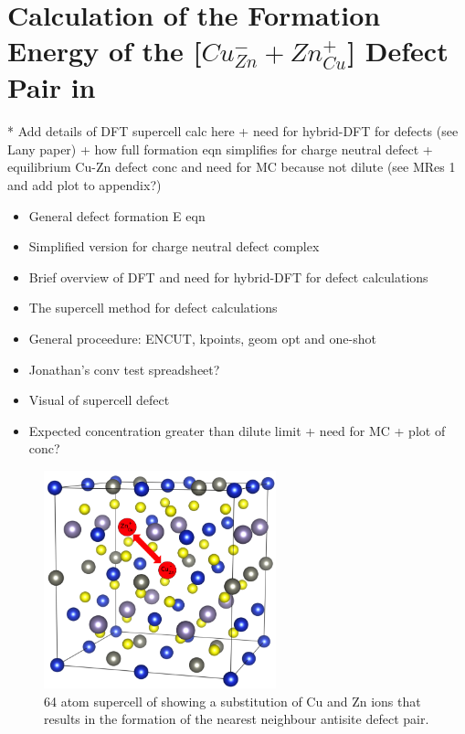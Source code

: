 \chapter{Calculation of the Formation Energy of the [$Cu_{Zn}^- + Zn_{Cu}^+$] Defect Pair in {\CZTS}}\label{Cu-Zn_defects_calc}

* Add details of DFT supercell calc here + need for hybrid-DFT for defects (see Lany paper) + how full formation eqn simplifies for charge neutral defect + equilibrium Cu-Zn defect conc and need for MC because not dilute (see MRes 1 and add plot to appendix?)

\begin{itemize}
\item General defect formation E eqn
\item Simplified version for charge neutral defect complex
\item Brief overview of DFT and need for hybrid-DFT for defect calculations
\item The supercell method for defect calculations
\item General proceedure: ENCUT, kpoints, geom opt and one-shot
\item Jonathan's conv test spreadsheet?
\item Visual of supercell defect
\item Expected concentration greater than dilute limit + need for MC + plot of conc?
\end{itemize}


\begin{figure}[h!]
  \centering
    \includegraphics[width=0.6\textwidth]{figures/Cu-Zn_defect.png}
    \caption{64 atom supercell of {\CZTS} showing a substitution of Cu and Zn ions that results in the formation of the nearest neighbour antisite defect pair.}
  \label{Cu-Zn_defect}
\end{figure}




